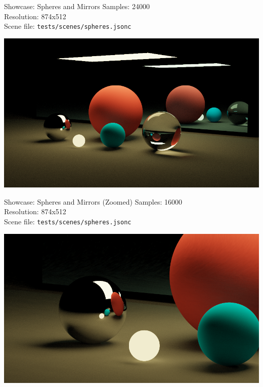 \documentclass{beamer}
\begin{document}
\begin{frame}{Showcase: Spheres and Mirrors}
    \footnotesize{
    Samples: 24000\\
    Resolution: 874x512\\
    Scene file: \texttt{tests/scenes/spheres.jsonc}
    }
    \begin{center}
        \includegraphics[width=1.00\textwidth]{../img/spheres.png}
    \end{center}
\end{frame}

\begin{frame}{Showcase: Spheres and Mirrors (Zoomed)}
    \footnotesize{
    Samples: 16000\\
    Resolution: 874x512\\
    Scene file: \texttt{tests/scenes/spheres.jsonc}
    }
    \begin{center}
        \includegraphics[width=1.00\textwidth]{../img/spheres-2.png}
    \end{center}
\end{frame}
\end{document}
